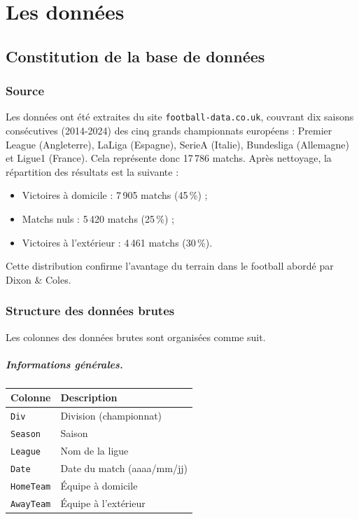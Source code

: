 \chapter{Les données}
\label{chap:data}

\section{Constitution de la base de données}


\subsection{Source}

Les données ont été extraites du site \texttt{football-data.co.uk}, couvrant
dix saisons consécutives (2014-2024) des cinq grands championnats européens :
Premier League (Angleterre), LaLiga (Espagne), SerieA (Italie), Bundesliga
(Allemagne) et Ligue1 (France). Cela représente donc 17\,786 matchs.
Après nettoyage, la répartition des résultats est la suivante :
\begin{itemize}
    \item Victoires à domicile : 7\,905 matchs (45\,\%) ;
    \item Matchs nuls : 5\,420 matchs (25\,\%) ;
    \item Victoires à l'extérieur : 4\,461 matchs (30\,\%).
\end{itemize}

Cette distribution confirme l'avantage du terrain dans le football abordé par Dixon \& Coles.

\subsection{Structure des données brutes}

Les colonnes des données brutes sont organisées comme suit.

\paragraph{Informations générales.}
\begin{center}
    \begin{tabular}{ll}
        \toprule
        \textbf{Colonne}  & \textbf{Description}       \\
        \midrule
        \texttt{Div}      & Division (championnat)     \\
        \texttt{Season}   & Saison                     \\
        \texttt{League}   & Nom de la ligue            \\
        \texttt{Date}     & Date du match (aaaa/mm/jj) \\
        \texttt{HomeTeam} & Équipe à domicile          \\
        \texttt{AwayTeam} & Équipe à l'extérieur       \\
        \bottomrule
    \end{tabular}
\end{center}

